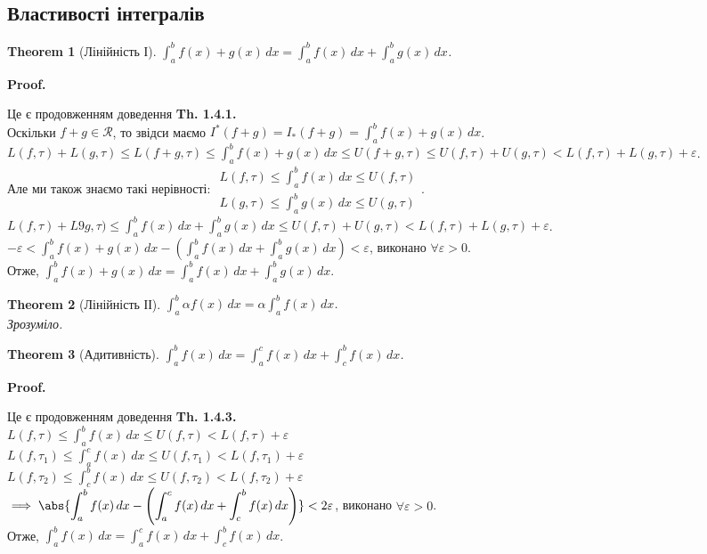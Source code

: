 \documentclass[a4paper, 10pt]{article}
\makeatletter
\def\huge{\displaystyle}
\def\qed{$\blacksquare$}
\theoremstyle{theoremdd}
\newtheorem{theorem}{Theorem}[subsection]
\theoremstyle{theoremdd}
\theoremstyle{theoremdd}
\theoremstyle{theoremdd}
\theoremstyle{theoremdd}
\theoremstyle{theoremdd}
\theoremstyle{theoremdd}
\theoremstyle{theoremdd}
\theoremstyle{theoremdd}
\renewenvironment{proof}[1][Proof.\\]{\par
\pushQED{\hfill \qed}%
\normalfont \topsep6\p@\@plus6\p@\relax
\trivlist
\item\relax
{\bfseries
#1\@addpunct{.}}\hspace\labelsep\ignorespaces
}{%
\popQED\endtrivlist\@endpefalse
}
\makeatother
\begin{document}
\subsection{Властивості інтегралів}
\begin{theorem}[Лінійність І]
$\huge\int_a^b f(x)+g(x)\,dx = \int_a^b f(x)\,dx + \int_a^b g(x)\,dx$.
\end{theorem}

\begin{proof}
Це є продовженням доведення \textbf{Th. 1.4.1.}\\
Оскільки $f+g \in \mathcal{R}$, то звідси маємо $I^*(f+g) = I_*(f+g) = \huge\int_a^b f(x)+g(x)\,dx$.\\
$L(f,\tau) + L(g,\tau) \leq L(f+g,\tau) \leq \huge\int_a^b f(x)+g(x)\,dx \leq U(f+g,\tau) \leq U(f, \tau) + U(g,\tau) < L(f,\tau) + L(g,\tau) + \varepsilon$.\\
Але ми також знаємо такі нерівності: $\begin{gathered}
L(f,\tau) \leq \huge\int_a^b f(x)\,dx \leq U(f, \tau)\\
L(g,\tau) \leq \huge\int_a^b g(x)\,dx \leq U(g,\tau)
\end{gathered}$.\\
$L(f,\tau) + L9g,\tau) \leq \huge\int_a^b f(x)\,dx + \int_a^b g(x)\,dx \leq U(f,\tau) + U(g,\tau) < L(f,\tau) + L(g,\tau) + \varepsilon$.\\
$-\varepsilon < \huge\int_a^b f(x)+g(x)\,dx - \left( \int_a^b f(x)\,dx + \int_a^b g(x)\,dx \right) < \varepsilon$, виконано $\forall \varepsilon > 0$.\\
Отже, $\huge\int_a^b f(x)+g(x)\,dx = \int_a^b f(x)\,dx + \int_a^b g(x)\,dx$.
\end{proof}

\begin{theorem}[Лінійність ІІ]
$\huge\int_a^b \alpha f(x)\,dx = \alpha \int_a^b f(x)\,dx$.\\
\textit{Зрозуміло.}
\end{theorem}

\begin{theorem}[Адитивність]
$\huge\int_a^b f(x)\,dx = \int_a^c f(x)\,dx + \int_c^b f(x)\,dx$.
\end{theorem}

\begin{proof}
Це є продовженням доведення \textbf{Th. 1.4.3.}\\
$L(f,\tau) \leq \huge\int_a^b f(x)\,dx \leq U(f, \tau) < L(f,\tau) + \varepsilon$\\
$L(f,\tau_1) \leq \huge\int_a^c f(x)\,dx \leq U(f,\tau_1) < L(f,\tau_1) + \varepsilon$\\
$L(f,\tau_2) \leq \huge\int_c^b f(x)\,dx \leq U(f,\tau_2) < L(f,\tau_2) + \varepsilon$\\
$\implies \abs{\huge\int_a^b f(x) \,dx - \left( \int_a^c f(x)\,dx + \int_c^b f(x)\,dx \right)} < 2\varepsilon$, виконано $\forall \varepsilon > 0$.\\
Отже, $\huge\int_a^b f(x)\,dx = \int_a^c f(x)\,dx + \int_c^b f(x)\,dx$.
\end{proof}
\end{document}
